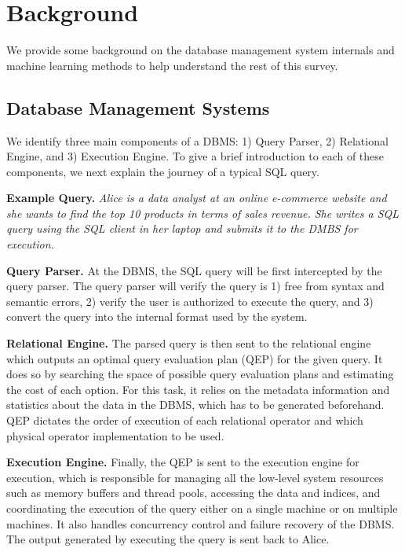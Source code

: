 \section{Background}
We provide some background on the database management system internals and machine learning methods to help understand the rest of this survey.

\subsection{Database Management Systems}
We identify three main components of a DBMS: 1) Query Parser, 2) Relational Engine, and 3) Execution Engine.
To give a brief introduction to each of these components, we next explain the journey of a typical SQL query.

\vspace{2mm}
\noindent \textbf{Example Query.} \textit{Alice is a data analyst at an online e-commerce website and she wants to find the top 10 products in terms of sales revenue.
She writes a SQL query using the SQL client in her laptop and submits it to the DMBS for execution.}

\vspace{2mm}
\noindent \textbf{Query Parser.} At the DBMS, the SQL query will be first intercepted by the query parser.
The query parser will verify the query is 1) free from syntax and semantic errors, 2) verify the user is authorized to execute the query, and 3) convert the query into the internal format used by the system.

\vspace{2mm}
\noindent \textbf{Relational Engine.} The parsed query is then sent to the relational engine which outputs an optimal query evaluation plan (QEP) for the given query.
It does so by searching the space of possible query evaluation plans and estimating the cost of each option.
For this task, it relies on the metadata information and statistics about the data in the DBMS, which has to be generated beforehand.
QEP dictates the order of execution of each relational operator and which physical operator implementation to be used.

\vspace{2mm}
\noindent \textbf{Execution Engine.} Finally, the QEP is sent to the execution engine for execution, which is responsible for managing all the low-level system resources such as memory buffers and thread pools, accessing the data and indices, and coordinating the execution of the query either on a single machine or on multiple machines.
It also handles concurrency control and failure recovery of the DBMS.
The output generated by executing the query is sent back to Alice.

